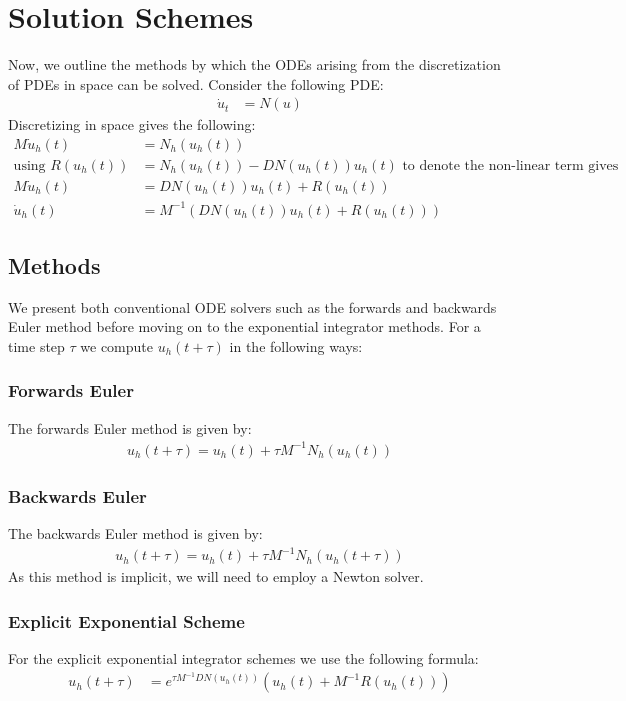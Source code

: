 \section{Solution Schemes} \label{section:methods}
Now, we outline the methods by which the ODEs arising from the discretization of PDEs in space can be solved. 
Consider the following PDE:
\begin{align*}
    \dot u_t &= N(u)
\end{align*}
Discretizing in space gives the following:
\begin{align*}
M\dot u_h(t) &= N_h(u_h(t))\\ %
\text{using } R(u_h(t)) &= N_h(u_h(t)) - DN(u_h(t))u_h(t) \text{ to denote the non-linear term gives}\\
M\dot u_h(t) &= DN(u_h(t))u_h(t) + R(u_h(t))\\
\dot u_h(t) &= M^{-1}(DN(u_h(t))u_h(t) + R(u_h(t)))
\end{align*}
\subsection{Methods}
We present both conventional ODE solvers such as the forwards and backwards Euler method before moving on to the exponential integrator methods.
For a time step $\tau$ we compute $u_h(t+\tau)$ in the following ways: 

\subsubsection{Forwards Euler}
The forwards Euler method is given by:
\begin{align*}
u_h(t+\tau) = u_h(t) + \tau M^{-1}N_h(u_h(t))
\end{align*}

\subsubsection{Backwards Euler}
The backwards Euler method is given by:
\begin{align*}
u_h(t+\tau) = u_h(t) + \tau M^{-1}N_h(u_h(t+\tau))
\end{align*}
As this method is implicit, we will need to employ a Newton solver.

\subsubsection{Explicit Exponential Scheme} %
For the explicit exponential integrator schemes we use the following formula:
\begin{align*}
u_h(t+\tau) &= e^{\tau M^{-1} DN(u_h(t))}(u_h(t) + M^{-1}R(u_h(t)))
\end{align*}


